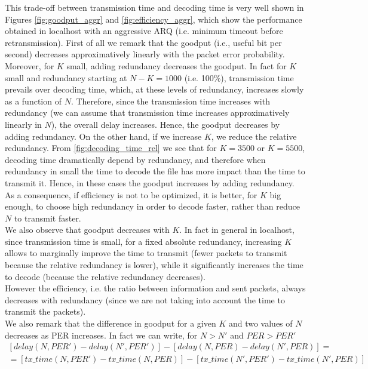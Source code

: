 This trade-off between transmission time and decoding time is very well shown in Figures \ref{fig:goodput_aggr} and \ref{fig:efficiency_aggr}, which show the performance obtained in localhost with an aggressive ARQ (i.e. minimum timeout before retransmission). First of all we remark that the goodput (i.e., useful bit per second) decreases approximatively linearly with the packet error probability. Moreover, for $K$ small, adding redundancy decreases the goodput. In fact for $K$ small and redundancy starting at $N-K=1000$ (i.e. 100\%), transmission time prevails over decoding time, which, at these levels of redundancy, increases slowly as a function of $N$. Therefore, since the transmission time increases with redundancy (we can assume that transmission time increases approximatively linearly in $N$), the overall delay increases. Hence, the goodput decreases by adding redundancy.
On the other hand, if we increase $K$, we reduce the relative redundancy. From \ref{fig:decoding_time_rel} we see that for $K=3500$ or $K=5500$, decoding time dramatically depend by redundancy, and therefore when redundancy in small the time to decode the file has more impact than the time to transmit it. Hence, in these cases the goodput increases by adding redundancy.  As a consequence, if efficiency is not to be optimized, it is better, for $K$ big enough, to choose high redundancy in order to decode faster, rather than reduce $N$ to transmit faster.\\
We also observe that goodput decreases with $K$. In fact in general in localhost, since transmission time is small, for a fixed absolute redundancy, increasing $K$ allows to marginally improve the time to transmit (fewer packets to transmit because the relative redundancy is lower), while it significantly increases the time to decode (because the relative redundancy decreases). \\
However the efficiency, i.e. the ratio between information and sent packets, always decreases with redundancy (since we are not taking into account the time to transmit the packets).\\
We also remark that the difference in goodput for a given $K$ and two values of $N$ decreases as PER increases. In fact we can write, for $N>N'$ and $PER>PER'$
\begin{equation*}
\begin{split}
[delay(N,PER')-delay(N',PER')]-[delay(N,PER)-delay(N',PER)]=\\
=[tx\_time(N,PER')-tx\_time(N,PER)]-[tx\_time(N',PER')-tx\_time(N',PER)]
\end{split}
\end{equation*}
